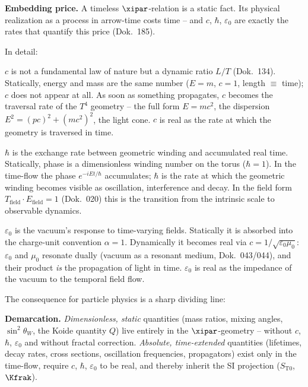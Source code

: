 \begin{erkenntnis}
\textbf{Embedding price.} A timeless $\xipar$-relation is a static fact. Its
physical realization as a process in arrow-time costs time -- and $c$, $\hbar$,
$\varepsilon_0$ are exactly the rates that quantify this price (Dok.~185).
\end{erkenntnis}

In detail:

\textbf{$c$} is not a fundamental law of nature but a dynamic ratio $L/T$
(Dok.~134). Statically, energy and mass are the same number ($E=m$, $c=1$, length
$\equiv$ time); $c$ does not appear at all. As soon as something propagates, $c$
becomes the traversal rate of the $T^4$ geometry -- the full form $E=mc^2$, the
dispersion $E^2=(pc)^2+(mc^2)^2$, the light cone. $c$ is real as the rate at which
the geometry is traversed in time.

\textbf{$\hbar$} is the exchange rate between geometric winding and accumulated
real time. Statically, phase is a dimensionless winding number on the torus
($\hbar=1$). In the time-flow the phase $e^{-iEt/\hbar}$ accumulates; $\hbar$ is
the rate at which the geometric winding becomes visible as oscillation,
interference and decay. In the field form $T_{\text{field}}\cdot E_{\text{field}}=1$
(Dok.~020) this is the transition from the intrinsic scale to observable dynamics.

\textbf{$\varepsilon_0$} is the vacuum's response to time-varying fields.
Statically it is absorbed into the charge-unit convention $\alpha=1$. Dynamically
it becomes real via $c=1/\sqrt{\varepsilon_0\mu_0}$: $\varepsilon_0$ and $\mu_0$
resonate dually (vacuum as a resonant medium, Dok.~043/044), and their product
\emph{is} the propagation of light in time. $\varepsilon_0$ is real as the
impedance of the vacuum to the temporal field flow.

The consequence for particle physics is a sharp dividing line:

\begin{prinzip}
\textbf{Demarcation.} \emph{Dimensionless, static} quantities (mass ratios,
mixing angles, $\sin^2\theta_W$, the Koide quantity $Q$) live entirely in the
$\xipar$-geometry -- without $c$, $\hbar$, $\varepsilon_0$ and without fractal
correction. \emph{Absolute, time-extended} quantities (lifetimes, decay rates,
cross sections, oscillation frequencies, propagators) exist only in the time-flow,
require $c$, $\hbar$, $\varepsilon_0$ to be real, and thereby inherit the SI
projection ($S_{\mathrm{T0}}$, $\Kfrak$).
\end{prinzip}

